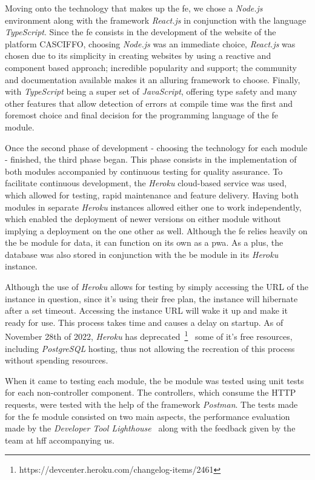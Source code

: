 Moving onto the technology that makes up the \acrshort{fe}, we chose a \textit{Node.js} environment along with the framework \textit{React.js} in conjunction with the language \textit{TypeScript}. 
Since the \acrshort{fe} consists in the development of the website of the platform CASCIFFO, choosing \textit{Node.js} was an immediate choice, \textit{React.js} was chosen due to its simplicity in creating websites by using a reactive and component based approach; incredible popularity and support; the community and documentation available makes it an alluring framework to choose. Finally, with \textit{TypeScript} being a super set of \textit{JavaScript}, offering type safety and many other features that allow detection of errors at compile time was the first and foremost choice and final decision for the programming language of the \acrshort{fe} module. 

Once the second phase of development - choosing the technology for each module - finished, the third phase began. This phase consists in the implementation of both modules accompanied by continuous testing for quality assurance. To facilitate continuous development, the \textit{Heroku} cloud-based service was used, which allowed for testing, rapid maintenance and feature delivery. 
Having both modules in separate \textit{Heroku} instances allowed either one to work independently, which enabled the deployment of newer versions on either module without implying a deployment on the one other as well. Although the \acrshort{fe} relies heavily on the \acrshort{be} module for data, it can function on its own as a \acrfull{pwa}. 
As a plus, the database was also stored in conjunction with the \acrshort{be} module in its \textit{Heroku} instance. 

Although the use of \textit{Heroku} allows for testing by simply accessing the URL of the instance in question, since it's using their free plan, the instance will hibernate after a set timeout. Accessing the instance URL will wake it up and make it ready for use. This process takes time and causes a delay on startup. As of November 28th of 2022, \textit{Heroku} has deprecated~\footnote{https://devcenter.heroku.com/changelog-items/2461}~\label{fn:heroku-rip} some of it's free resources, including \textit{PostgreSQL} hosting, thus not allowing the recreation of this process without spending resources.  

When it came to testing each module, the \acrshort{be} module was tested using unit tests for each non-controller component. The controllers, which consume the HTTP requests, were tested with the help of the framework \textit{Postman}. The tests made for the \acrshort{fe} module consisted on two main aspects, the performance evaluation made by the \textit{Developer Tool Lighthouse}~\cite{lighthouse} along with the feedback given by the team at \acrshort{hff} accompanying us.

